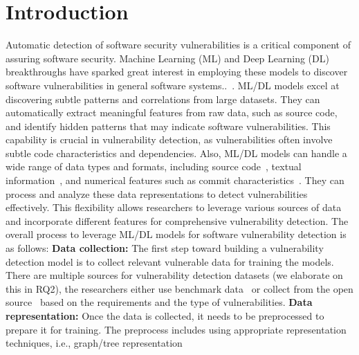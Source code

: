\section{Introduction}
\label{sec:intro}
Automatic detection of software security vulnerabilities is a critical component of assuring software security. Machine Learning (ML) and Deep Learning (DL) breakthroughs have sparked great interest in employing these models to discover software vulnerabilities in general software systems..~\cite{wang2018deep,cheng2021deepwukong,li2021vulnerability,le2021deepcva,yan2021han}. {ML/DL models excel at discovering subtle patterns and correlations from large datasets. They can automatically extract meaningful features from raw data, such as source code, and identify hidden patterns that may indicate software vulnerabilities. This capability is crucial in vulnerability detection, as vulnerabilities often involve subtle code characteristics and dependencies. Also, ML/DL models can handle a wide range of data types and formats, including source code~\cite{dam2018automatic,
dam2017automatic,
shippey2019automatically,
wang2016automatically,
jeon2021autovas,
tian2020bvdetector,
liu2020cd,
yamaguchi2013chucky}, textual information~\cite{hoang2019deepjit}, and numerical features such as commit characteristics~\cite{pascarella2019fine,
Vuldiggerpaper}. They can process and analyze these data representations to detect vulnerabilities effectively. This flexibility allows researchers to leverage various sources of data and incorporate different features for comprehensive vulnerability detection.} The overall process to leverage ML/DL models for software vulnerability detection is as follows: \noindent \textbf{Data collection:} The first step toward building a vulnerability detection model is to collect relevant vulnerable data for training the models. There are multiple sources for vulnerability detection datasets (we elaborate on this in RQ2), the researchers either use benchmark data~\cite{le2018maximal,
zou2019mu,
cao2022mvd,
ghaffarian2021neural,
wu2021peculiar,
ziems2021security,
zhuang2020smart,
li2021sysevr,
filus2020random,
li2018vuldeepecker,
Vuldiggerpaper} or collect from the open source~\cite{fu2022linevul,
chen2021neural,
perl2015vccfinder,
riom2021revisiting,
ni2022best} based on the requirements and the type of vulnerabilities. \noindent \textbf{Data representation:} Once the data is collected, it needs to be preprocessed to prepare it for training. The preprocess includes using appropriate representation techniques, i.e., graph/tree representation~\cite{zou2019mu,
}
